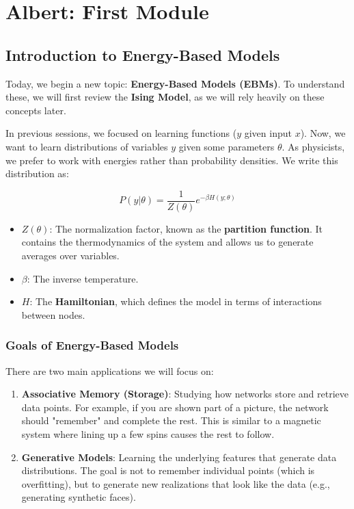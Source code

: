 \chapter{Albert: First Module}


\section{Introduction to Energy-Based Models}
Today, we begin a new topic: \textbf{Energy-Based Models (EBMs)}. To understand these, we will first review the \textbf{Ising Model}, as we will rely heavily on these concepts later.

In previous sessions, we focused on learning functions ($y$ given input $x$). Now, we want to learn distributions of variables $y$ given some parameters $\theta$. As physicists, we prefer to work with energies rather than probability densities. We write this distribution as:

\[ P(y|\theta) = \frac{1}{Z(\theta)} e^{-\beta H(y; \theta)} \]

\begin{itemize}
    \item \textbf{$Z(\theta)$}: The normalization factor, known as the \textbf{partition function}. It contains the thermodynamics of the system and allows us to generate averages over variables.
    \item \textbf{$\beta$}: The inverse temperature.
    \item \textbf{$H$}: The \textbf{Hamiltonian}, which defines the model in terms of interactions between nodes.
\end{itemize}

\subsection{Goals of Energy-Based Models}
There are two main applications we will focus on:
\begin{enumerate}
    \item \textbf{Associative Memory (Storage)}: Studying how networks store and retrieve data points. For example, if you are shown part of a picture, the network should "remember" and complete the rest. This is similar to a magnetic system where lining up a few spins causes the rest to follow.
    \item \textbf{Generative Models}: Learning the underlying features that generate data distributions. The goal is not to remember individual points (which is overfitting), but to generate new realizations that look like the data (e.g., generating synthetic faces).
\end{enumerate}

